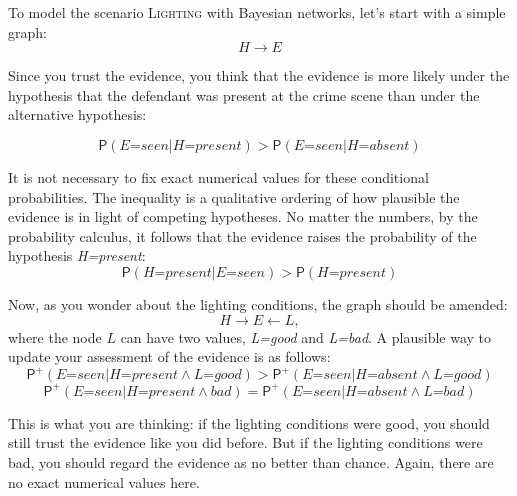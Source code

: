 \documentclass[
  11pt,
  dvipsnames,enabledeprecatedfontcommands]{scrartcl}
\newcommand{\pr}[1]{\ensuremath{\mathsf{P}(#1)}}
\newcommand{\ppr}[2]{\ensuremath{\mathsf{P}^{#1}(#2)}}
\begin{document}
To model the scenario \textsc{Lighting} with Bayesian networks, let's
start with a simple graph: \[H \rightarrow E\]

\noindent Since you trust the evidence, you think that the evidence is
more likely under the hypothesis that the defendant was present at the
crime scene than under the alternative hypothesis:

\[\pr{\textit{E=seen} \vert \textit{H=present}} > \pr{\textit{E=seen} \vert \textit{H=absent}}\]

\noindent It is not necessary to fix exact numerical values for these
conditional probabilities. The inequality is a qualitative ordering of
how plausible the evidence is in light of competing hypotheses. No
matter the numbers, by the probability calculus, it follows that the
evidence raises the probability of the hypothesis \textit{H=present}:
\[\pr{\textit{H=present}\vert \textit{E=seen}} > \pr{\textit{H=present}}\]

\noindent Now, as you wonder about the lighting conditions, the graph
should be amended: \[H \rightarrow E \leftarrow L,\] where the node
\(L\) can have two values, \textit{L=good} and \textit{L=bad}. A
plausible way to update your assessment of the evidence is as follows:
\[\ppr{+}{\textit{E=seen} \vert \textit{H=present} \wedge \textit{L=good}} > \ppr{+}{\textit{E=seen} \vert \textit{H=absent} \wedge \textit{L=good}}\]
\[\ppr{+}{\textit{E=seen} \vert \textit{H=present} \wedge \textit{bad}} = \ppr{+}{\textit{E=seen} \vert \textit{H=absent} \wedge \textit{L=bad}}\]

\noindent This is what you are thinking: if the lighting conditions were
good, you should still trust the evidence like you did before. But if
the lighting conditions were bad, you should regard the evidence as no
better than chance. Again, there are no exact numerical values here.
\end{document}
